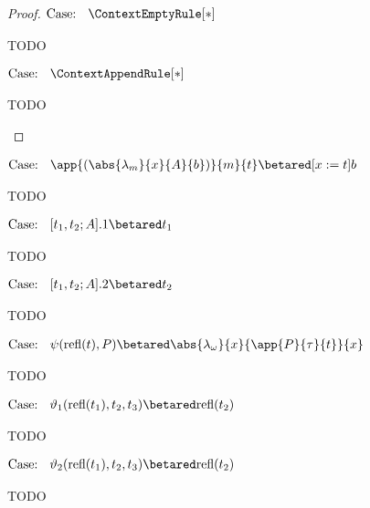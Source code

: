 \begin{proof}
$\text{Case: }\begin{array}{c} \ContextEmptyRule[*] \end{array}$
\begin{proofcase}
    TODO
\end{proofcase}

$\text{Case: }\begin{array}{c} \ContextAppendRule[*] \end{array}$
\begin{proofcase}
    TODO
\end{proofcase}
\end{proof}



$\text{Case: }\begin{array}{c} \app{(\abs{\lambda_m}{x}{A}{b})}{m}{t} \betared [x := t]b \end{array}$
\begin{proofcase}
    TODO
\end{proofcase}

$\text{Case: }\begin{array}{c} [t_1, t_2; A].1 \betared t_1 \end{array}$
\begin{proofcase}
    TODO
\end{proofcase}

$\text{Case: }\begin{array}{c} [t_1, t_2; A].2 \betared t_2 \end{array}$
\begin{proofcase}
    TODO
\end{proofcase}

$\text{Case: }\begin{array}{c} \psi(\text{refl}(t),P) \betared \abs{\lambda_\omega}{x}{\app{P}{\tau}{t}}{x} \end{array}$
\begin{proofcase}
    TODO
\end{proofcase}

$\text{Case: }\begin{array}{c} \vartheta_1(\text{refl}(t_1), t_2, t_3) \betared \text{refl}(t_2) \end{array}$
\begin{proofcase}
    TODO
\end{proofcase}

$\text{Case: }\begin{array}{c} \vartheta_2(\text{refl}(t_1), t_2, t_3) \betared \text{refl}(t_2) \end{array}$
\begin{proofcase}
    TODO
\end{proofcase}

